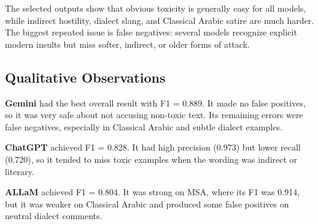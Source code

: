 \begin{table}[H]
\centering
\caption{Selected model outputs from the final run. Full Arabic inputs are in the submitted logs.}
\label{tab:problem5-selected-outputs}
\scriptsize
{}
\end{table}

The selected outputs show that obvious toxicity is generally easy for all models, while indirect hostility, dialect slang, and Classical Arabic satire are much harder. The biggest repeated issue is false negatives: several models recognize explicit modern insults but miss softer, indirect, or older forms of attack.

\subsection{Qualitative Observations}
\textbf{Gemini} had the best overall result with F1 = 0.889. It made no false positives, so it was very safe about not accusing non-toxic text. Its remaining errors were false negatives, especially in Classical Arabic and subtle dialect examples.

\textbf{ChatGPT} achieved F1 = 0.828. It had high precision (0.973) but lower recall (0.720), so it tended to miss toxic examples when the wording was indirect or literary.

\textbf{ALLaM} achieved F1 = 0.804. It was strong on MSA, where its F1 was 0.914, but it was weaker on Classical Arabic and produced some false positives on neutral dialect comments.

